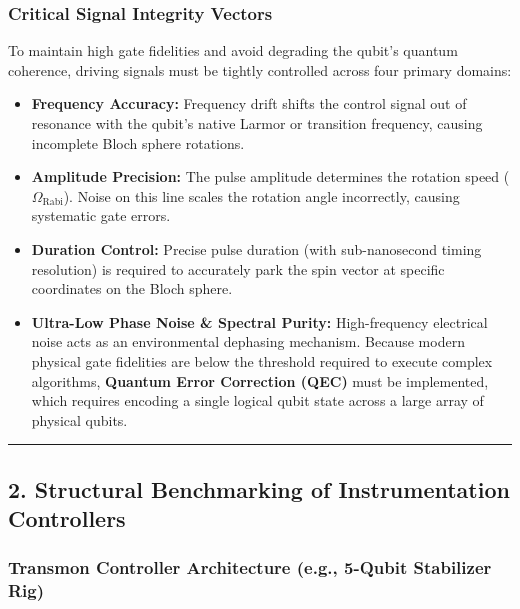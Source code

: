 \documentclass[
]{article}
\providecommand{\tightlist}{%
  \setlength{\itemsep}{0pt}\setlength{\parskip}{0pt}}
\begin{document}
\subsubsection{Critical Signal Integrity
Vectors}\label{critical-signal-integrity-vectors}

To maintain high gate fidelities and avoid degrading the qubit's quantum
coherence, driving signals must be tightly controlled across four
primary domains:

\begin{itemize}
\tightlist
\item
  \textbf{Frequency Accuracy:} Frequency drift shifts the control signal
  out of resonance with the qubit's native Larmor or transition
  frequency, causing incomplete Bloch sphere rotations.
\item
  \textbf{Amplitude Precision:} The pulse amplitude determines the
  rotation speed (\(\Omega_{\text{Rabi}}\)). Noise on this line scales
  the rotation angle incorrectly, causing systematic gate errors.
\item
  \textbf{Duration Control:} Precise pulse duration (with sub-nanosecond
  timing resolution) is required to accurately park the spin vector at
  specific coordinates on the Bloch sphere.
\item
  \textbf{Ultra-Low Phase Noise \& Spectral Purity:} High-frequency
  electrical noise acts as an environmental dephasing mechanism. Because
  modern physical gate fidelities are below the threshold required to
  execute complex algorithms, \textbf{Quantum Error Correction (QEC)}
  must be implemented, which requires encoding a single logical qubit
  state across a large array of physical qubits.
\end{itemize}

\begin{center}\rule{0.5\linewidth}{0.5pt}\end{center}

\subsection{2. Structural Benchmarking of Instrumentation
Controllers}\label{structural-benchmarking-of-instrumentation-controllers}

\subsubsection{Transmon Controller Architecture (e.g., 5-Qubit
Stabilizer
Rig)}\label{transmon-controller-architecture-e.g.-5-qubit-stabilizer-rig}
\end{document}
